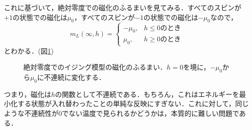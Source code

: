 \documentclass[a4paper,11pt]{jsreport}
\begin{document}
これに基づいて，絶対零度での磁化のふるまいを見てみる．すべてのスピンが$+1$の状態での磁化は$\mu_0$，すべてのスピンが$-1$の状態での磁化は$-\mu_0$なので，
\begin{equation}
  m_L(\infty, h) =
  \begin{cases}
    -\mu_0, & h \leq 0 \text{のとき} \\
    \mu_0,  & h \geq 0 \text{のとき}
  \end{cases}
\end{equation}
とわかる．(図\ref{絶対零度磁化})
\begin{figure}[h]
  \begin{center}
    \caption{絶対零度でのイジング模型の磁化のふるまい．$h=0$を境に，$-\mu_0$から$\mu_0$に不連続に変化する．\label{絶対零度磁化}}
  \end{center}
\end{figure}
つまり，磁化は$h$の関数として不連続である．もちろん，これはエネルギーを最小化する状態が入れ替わったことの単純な反映にすぎない．これに対して，同じような不連続性が$0$でない温度で見られるかどうかは，本質的に難しい問題である．
\end{document}
